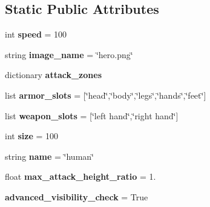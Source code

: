 \subsection*{Static Public Attributes}
\begin{DoxyCompactItemize}
\item 
\hypertarget{classmonster__body_1_1_human_body_a9fffe854261de1f047670d7ac5b23124}{}int {\bfseries speed} = 100\label{classmonster__body_1_1_human_body_a9fffe854261de1f047670d7ac5b23124}

\item 
\hypertarget{classmonster__body_1_1_human_body_a147755a5f9ed64bf6474f8ee0c0dbe59}{}string {\bfseries image\+\_\+name} = \char`\"{}hero.\+png\char`\"{}\label{classmonster__body_1_1_human_body_a147755a5f9ed64bf6474f8ee0c0dbe59}

\item 
dictionary {\bfseries attack\+\_\+zones}
\item 
\hypertarget{classmonster__body_1_1_human_body_a35a92189542e578c90de8bf9bfa71434}{}list {\bfseries armor\+\_\+slots} = \mbox{[}\char`\"{}head\char`\"{},\char`\"{}body\char`\"{},\char`\"{}legs\char`\"{},\char`\"{}hands\char`\"{},\char`\"{}feet\char`\"{}\mbox{]}\label{classmonster__body_1_1_human_body_a35a92189542e578c90de8bf9bfa71434}

\item 
\hypertarget{classmonster__body_1_1_human_body_a311106a6662abeed8e75da1cb1bdc82d}{}list {\bfseries weapon\+\_\+slots} = \mbox{[}\char`\"{}left hand\char`\"{},\char`\"{}right hand\char`\"{}\mbox{]}\label{classmonster__body_1_1_human_body_a311106a6662abeed8e75da1cb1bdc82d}

\item 
\hypertarget{classmonster__body_1_1_human_body_a8ce06823f04afb91da9e696276182531}{}int {\bfseries size} = 100\label{classmonster__body_1_1_human_body_a8ce06823f04afb91da9e696276182531}

\item 
\hypertarget{classmonster__body_1_1_human_body_a38279ea5f72ea0031f1bc7418c811162}{}string {\bfseries name} = \char`\"{}human\char`\"{}\label{classmonster__body_1_1_human_body_a38279ea5f72ea0031f1bc7418c811162}

\item 
\hypertarget{classmonster__body_1_1_human_body_a1faf8072cedcecb17ef3f00babaf6ca7}{}float {\bfseries max\+\_\+attack\+\_\+height\+\_\+ratio} = 1.\label{classmonster__body_1_1_human_body_a1faf8072cedcecb17ef3f00babaf6ca7}

\item 
\hypertarget{classmonster__body_1_1_human_body_a1393c442632780dd8ca32c921595fe92}{}{\bfseries advanced\+\_\+visibility\+\_\+check} = True\label{classmonster__body_1_1_human_body_a1393c442632780dd8ca32c921595fe92}

\end{DoxyCompactItemize}


